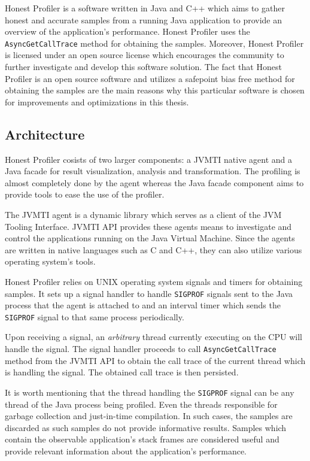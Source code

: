 \documentclass[..thesis.tex]{subfiles}
\begin{document}
Honest Profiler \cite{hon_prof} is a software written in Java and C++ which aims to gather honest and accurate samples from a running Java application to provide an overview of the application's performance. Honest Profiler uses the \texttt{Async\-Get\-Call\-Trace} method for obtaining the samples. Moreover, Honest Profiler is licensed under an open source license which encourages the community to further investigate and develop this software solution. The fact that Honest Profiler is an open source software and utilizes a safepoint bias free method for obtaining the samples are the main reasons why this particular software is chosen for improvements and optimizations in this thesis.

\subsection{Architecture}
Honest Profiler cosists of two larger components: a JVMTI native agent and a Java facade for result visualization, analysis and transformation. The profiling is almost completely done by the agent whereas the Java facade component aims to provide tools to ease the use of the profiler.

The JVMTI agent is a dynamic library which serves as a client of the JVM Tooling Interface. \cite{jvmtm} JVMTI API provides these agents means to investigate and control the applications running on the Java Virtual Machine. Since the agents are written in native languages such as C and C++, they can also utilize various operating system's tools.

Honest Profiler relies on UNIX operating system signals and timers for obtaining samples.
It sets up a signal handler to handle \texttt{SIGPROF} signals sent to the Java process that the agent is attached to and an interval timer which sends the \texttt{SIGPROF} signal to that same process periodically. 

Upon receiving a signal, an \textit{arbitrary} thread currently executing on the CPU will handle the signal. \cite{stevens_advanced_2013} The signal handler proceeds to call \texttt{AsyncGetCallTrace} method from the JVMTI API to obtain the call trace of the current thread which is handling the signal. The obtained call trace is then persisted.

It is worth mentioning that the thread handling the \texttt{SIGPROF} signal can be any thread of the Java process being profiled. Even the threads responsible for garbage collection and just-in-time compilation. In such cases, the samples are discarded as such samples do not provide informative results. Samples which contain the observable application's stack frames are considered useful and provide relevant information about the application's performance.
\end{document}
